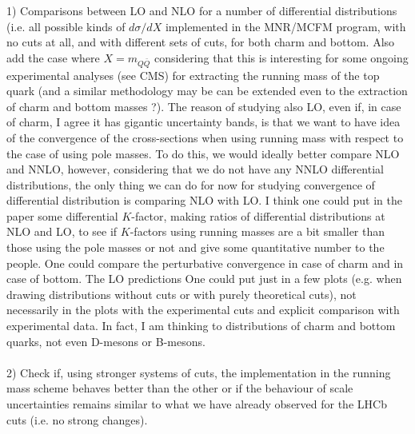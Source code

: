 \documentclass[12pt,a4paper]{article}
\begin{document}
1) Comparisons between LO and NLO for a number of differential
distributions (i.e. all possible kinds of $d\sigma/dX$ implemented in 
the MNR/MCFM program, with no cuts at all, and with different sets of cuts,
for both charm and bottom. Also add the case where $X=m_{Q\bar{Q}}$ considering
that this is interesting for some ongoing experimental analyses (see CMS)
for extracting the running mass of the top quark (and a similar methodology may be can be extended even to the extraction of charm and bottom masses ?). 
The reason of studying also LO, even if, in case of charm, I agree
it has gigantic uncertainty bands, is that we want to have idea of
the convergence of the cross-sections when using running mass with respect
to the case of using pole masses. 
To do this, we would ideally better compare NLO and NNLO, 
however, considering that we do not have any NNLO differential distributions,
the only thing we can do for now for studying convergence of differential distribution is comparing NLO with LO. 
I think one could put in the paper some differential $K$-factor, making ratios of
differential distributions at NLO and LO, to see if $K$-factors using running masses are a bit smaller than those using the pole masses or not and give some
quantitative number to the people. One could compare the perturbative
convergence in case of charm and in case of bottom.   
The LO predictions One could put just in a few plots (e.g. when drawing distributions without cuts or with purely theoretical cuts), 
not necessarily in the plots with the experimental cuts and explicit comparison with experimental data. In fact, I am thinking to distributions of charm and bottom quarks, not even D-mesons or B-mesons. 
\\
\\
2) Check if, using stronger systems of cuts, the implementation in the running mass scheme behaves better than the other or if the behaviour of scale uncertainties remains similar to what we have already observed for the LHCb cuts (i.e. no strong changes). 
\end{document}

